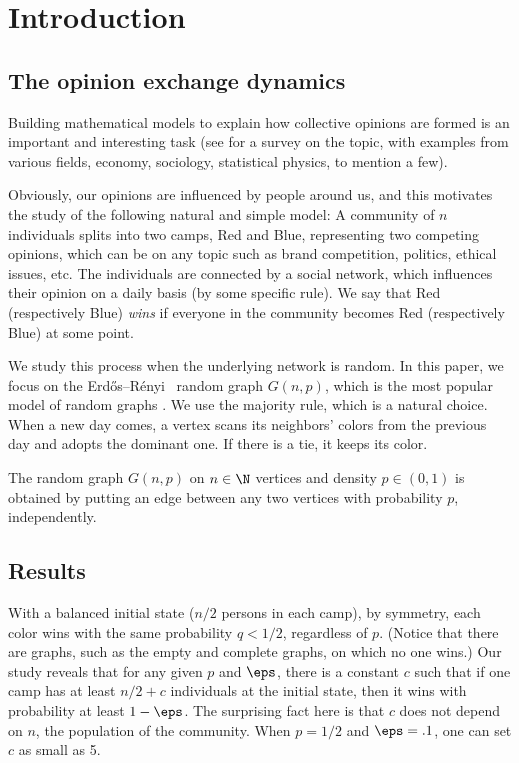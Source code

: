 \documentclass{toc}
\newcommand{\err}{Erd\H{o}s--R{\'e}nyi}
\begin{document}
			
			\section {Introduction} \label{sec:introduction}
			
			
			\subsection {The opinion exchange  dynamics}
			
			Building mathematical models to explain how collective opinions are formed is an important and interesting task (see \cite{mossel2017} for a survey on the topic, with examples from  various fields, economy, sociology, statistical physics, to mention a few).
			
			Obviously, our opinions are influenced by people around us, and this motivates the study of the following natural and simple model:
			A community of $n$ individuals splits into two camps,  Red and Blue, representing two competing opinions, which can be on any topic such as brand competition, politics, ethical issues, etc. The individuals are connected by a social network, which influences  their opinion on a daily basis (by some specific rule). We say that Red (respectively Blue) \emph{wins} if everyone in the community becomes Red (respectively Blue) at some point.
			
			
			We study  this process  when the underlying network is random. In this paper, we focus on the %
			\err\   %
			random graph $G(n, p)$, which is the most popular model of random graphs  \cite{Bollobasbook, Jansonbook}. We use the majority rule, which is a natural choice. When a new day comes, a vertex scans its neighbors' colors %
			from  %
			the previous day and adopts the dominant one. If there is a tie, it keeps its color.
			
			
			\begin{definition} The random graph $G(n,p)$ on $n\in \N$ vertices and density $p\in (0, 1)$ is obtained by putting an edge between any two vertices with probability $p$, independently.
			\end{definition}
			
			
			
			\subsection{Results}
			With a balanced initial state ($n/2$ persons in each camp), by symmetry, each color wins with the same  probability $q < 1/2$, regardless of $p$.   (Notice that there are graphs, such as the empty and complete graphs, on which no one wins.)
			Our study reveals  that for any given $p$ and $\eps$, there is  a constant $c$ such that if one camp has at least $n/2 + c$ individuals at the initial state, then
			it wins with probability at least $1- \eps$.  The surprising fact here is that $c$ does not depend on $n$, the population of the community. When $p=1/2$ and $\eps =.1$, one can set
			$c$ as small as 5.
			
\end{document}
